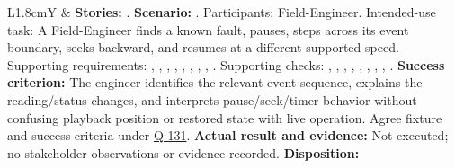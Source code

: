 \begin{tabularx}{\linewidth}{L{1.8cm}Y}
 & \textbf{Stories:} . \textbf{Scenario:} . Participants: Field-Engineer. Intended-use task: A Field-Engineer finds a known fault, pauses, steps across its event boundary, seeks backward, and resumes at a different supported speed. Supporting requirements: , , , , , , , , . Supporting checks: , , , , , , , , . \textbf{Success criterion:} The engineer identifies the relevant event sequence, explains the reading/status changes, and interprets pause/seek/timer behavior without confusing playback position or restored state with live operation. Agree fixture and success criteria under \hyperref[Question:Q-131]{Q-131}. \textbf{Actual result and evidence:} Not executed; no stakeholder observations or evidence recorded. \textbf{Disposition:} \StatusPending\\
\end{tabularx}
\normalsize
